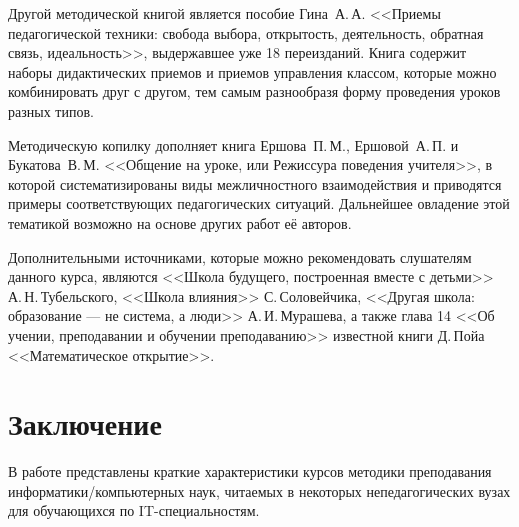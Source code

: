 \documentclass{math-mech-sci}
\begin{document}
Другой методической книгой является пособие Гина А.\,А. <<Приемы педагогической техники: свобода выбора, открытость, деятельность, обратная связь, идеальность>>, выдержавшее уже 18 переизданий. Книга содержит наборы дидактических приемов и приемов управления классом, которые можно комбинировать друг с другом, тем самым разнообразя форму проведения уроков разных типов.

Методическую копилку дополняет книга Ершова~П.\,М., Ершовой~А.\,П. и Букатова~В.\,М. <<Общение на уроке, или
Режиссура поведения учителя>>, в которой систематизированы виды межличностного взаимодействия и приводятся примеры соответствующих педагогических ситуаций. Дальнейшее овладение этой тематикой возможно на основе других работ её авторов.

Дополнительными источниками, которые можно рекомендовать слушателям данного курса, являются <<Школа будущего, построенная вместе с детьми>> А.\,Н.\,Тубельского, <<Школа влияния>> С.\,Соловейчика, <<Другая школа: образование --- не система, а люди>> А.\,И.\,Мурашева, а также глава 14 <<Об учении, преподавании и обучении преподаванию>> известной книги Д.\,Пойа <<Математическое открытие>>.


\section{Заключение}

В работе представлены краткие характеристики курсов методики преподавания информатики/компьютерных наук, читаемых в некоторых непедагогических вузах для обучающихся по IT-специальностям.
\end{document}
